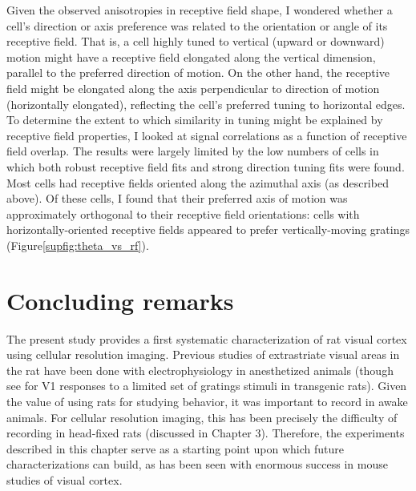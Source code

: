 Given the observed anisotropies in receptive field shape, I wondered whether a cell's direction or axis preference was related to the orientation or angle of its receptive field. That is, a cell highly tuned to vertical (upward or downward) motion might have a receptive field elongated along the vertical dimension, parallel to the preferred direction of motion. On the other hand, the receptive field might be elongated along the axis perpendicular to direction of motion (horizontally elongated), reflecting the cell's preferred tuning to horizontal edges. To determine the extent to which similarity in tuning might be explained by receptive field properties, I looked at signal correlations as a function of receptive field overlap. The results were largely limited by the low numbers of cells in which both robust receptive field fits and strong direction tuning fits were found. Most cells had receptive fields oriented along the azimuthal axis (as described above). Of these cells, I found that their preferred axis of motion was approximately orthogonal to their receptive field orientations:  cells with horizontally-oriented receptive fields appeared to prefer  vertically-moving gratings (Figure\ref{supfig:theta_vs_rf}). 


\section{Concluding remarks}
The present study provides a first systematic characterization of rat visual cortex using cellular resolution imaging. Previous studies of extrastriate visual areas in the rat have been done with electrophysiology in anesthetized animals\cite{Girman1999a, Vermaercke2014, Tafazoli2017} (though see \citet{Scott2018} for V1 responses to a limited set of gratings stimuli in transgenic rats). Given the value of using rats for studying behavior, it was important to record in awake animals. For cellular resolution imaging, this has been precisely the difficulty of recording in head-fixed rats (discussed in Chapter 3). Therefore, the experiments described in this chapter serve as a starting point upon which future characterizations can build, as has been seen with enormous success in mouse studies of visual cortex.

